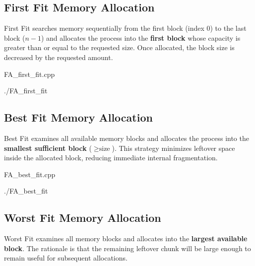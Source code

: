 \documentclass[11pt,a4paper]{article}
\begin{document}

\subsection{First Fit Memory Allocation}
First Fit searches memory sequentially from the first block (index $0$) to the last block ($n-1$) and allocates the process into the \textbf{first block} whose capacity is greater than or equal to the requested size. Once allocated, the block size is decreased by the requested amount.

\begin{codebox}{FA\_first\_fit.cpp}

\end{codebox}

\vspace{0.8em}
\begin{termbox}{./FA\_first\_fit}

\end{termbox}

\newpage

\subsection{Best Fit Memory Allocation}
Best Fit examines all available memory blocks and allocates the process into the \textbf{smallest sufficient block} ($\ge \text{size}$). This strategy minimizes leftover space inside the allocated block, reducing immediate internal fragmentation.

\begin{codebox}{FA\_best\_fit.cpp}

\end{codebox}

\vspace{0.8em}
\begin{termbox}{./FA\_best\_fit}

\end{termbox}

\newpage

\subsection{Worst Fit Memory Allocation}
Worst Fit examines all memory blocks and allocates into the \textbf{largest available block}. The rationale is that the remaining leftover chunk will be large enough to remain useful for subsequent allocations.
\end{document}
